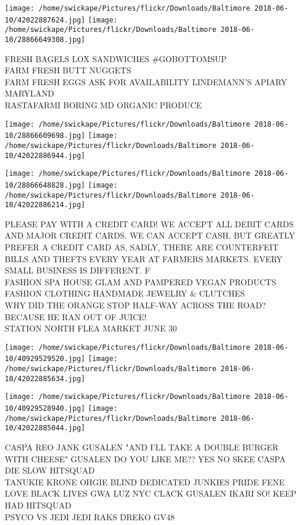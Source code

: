\documentclass[10pt,letterpaper]{article}
\begin{document}
\texttt{[image: /home/swickape/Pictures/flickr/Downloads/Baltimore 2018-06-10/42022887624.jpg]}
\texttt{[image: /home/swickape/Pictures/flickr/Downloads/Baltimore 2018-06-10/28866649308.jpg]}

FRESH BAGELS LOX SANDWICHES \#GOBOTTOMSUP\\
FARM FRESH BUTT NUGGETS\\
FARM FRESH EGGS ASK FOR AVAILABILITY LINDEMANN'S APIARY MARYLAND\\
RASTAFARMI BORING MD ORGANIC PRODUCE\\
\pagebreak

\texttt{[image: /home/swickape/Pictures/flickr/Downloads/Baltimore 2018-06-10/28866609698.jpg]}
\texttt{[image: /home/swickape/Pictures/flickr/Downloads/Baltimore 2018-06-10/42022886944.jpg]}

\texttt{[image: /home/swickape/Pictures/flickr/Downloads/Baltimore 2018-06-10/28866648828.jpg]}
\texttt{[image: /home/swickape/Pictures/flickr/Downloads/Baltimore 2018-06-10/42022886214.jpg]}

PLEASE PAY WITH A CREDIT CARD!  WE ACCEPT ALL DEBIT CARDS AND MAJOR CREDIT CARDS.  WE CAN ACCEPT CASH, BUT GREATLY PREFER A CREDIT CARD AS, SADLY, THERE ARE COUNTERFEIT BILLS AND THEFTS EVERY YEAR AT FARMERS MARKETS.  EVERY SMALL BUSINESS IS DIFFERENT.  F\\
FASHION SPA HOUSE GLAM AND PAMPERED VEGAN PRODUCTS FASHION CLOTHING HANDMADE JEWELRY \& CLUTCHES\\
WHY DID THE ORANGE STOP HALF{-}WAY ACROSS THE ROAD?  BECAUSE HE RAN OUT OF JUICE!\\
STATION NORTH FLEA MARKET JUNE 30\\
\pagebreak

\texttt{[image: /home/swickape/Pictures/flickr/Downloads/Baltimore 2018-06-10/40929529520.jpg]}
\texttt{[image: /home/swickape/Pictures/flickr/Downloads/Baltimore 2018-06-10/42022885634.jpg]}

\texttt{[image: /home/swickape/Pictures/flickr/Downloads/Baltimore 2018-06-10/40929528940.jpg]}
\texttt{[image: /home/swickape/Pictures/flickr/Downloads/Baltimore 2018-06-10/42022885044.jpg]}

CASPA REO JANK GUSALEN "AND I'LL TAKE A DOUBLE BURGER WITH CHEESE" GUSALEN DO YOU LIKE ME?? YES NO SKEE CASPA DIE SLOW HITSQUAD\\
TANUKIE KRONE OHGIE BLIND DEDICATED JUNKIES PRIDE FENE\\
LOVE BLACK LIVES GWA LUZ NYC CLACK GUSALEN IKARI SO!  KEEP HAD HITSQUAD\\
PSYCO VS JEDI JEDI RAKS DREKO GV48\\
\pagebreak
\end{document}
